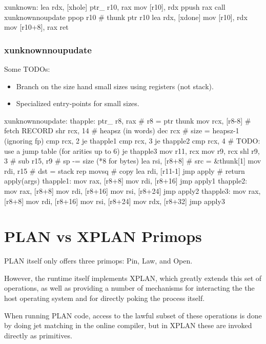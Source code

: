 \begin{asm}
xunknown:
	lea	rdx, [xhole]
	ptr_	r10, rax
	mov	[r10], rdx
	ppush	rax
	call	xunknownnoupdate
	ppop	r10               # thunk
	ptr	r10
	lea	rdx, [xdone]
	mov	[r10], rdx
	mov	[r10+8], rax
	ret
\end{asm}

\subsubsection{xunknownnoupudate}

Some TODOs:

\begin{itemize}
\item Branch on the size hand small sizes using registers (not stack).
\item Specialized entry-points for small sizes.
\end{itemize}

\begin{asm}
xunknownnoupdate:
thapple:
	ptr_	r8, rax        # r8 = ptr thunk
	mov	rcx, [r8-8]    # fetch RECORD
	shr	rcx, 14        # heapsz (in words)
	dec	rcx            # size = heapsz-1 (ignoring fp)
	cmp	rcx, 2
	je	thapple1
	cmp	rcx, 3
	je	thapple2
	cmp	rcx, 4	       # TODO: use a jump table (for arities up to 6)
	je	thapple3
	mov	r11, rcx
	mov	r9, rcx
	shl	r9, 3          #
	sub	r15, r9        # sp -= size (*8 for bytes)
	lea	rsi, [r8+8]    # src = &thunk[1]
	mov	rdi, r15       # dst = stack
	rep	movsq          # copy
	lea	rdi, [r11-1]
	jmp	apply          # return apply(args)
thapple1:
	mov	rax, [r8+8]
	mov	rdi, [r8+16]
	jmp	apply1
thapple2:
	mov	rax, [r8+8]
	mov	rdi, [r8+16]
	mov	rsi, [r8+24]
	jmp	apply2
thapple3:
	mov	rax, [r8+8]
	mov	rdi, [r8+16]
	mov	rsi, [r8+24]
	mov	rdx, [r8+32]
	jmp	apply3
\end{asm}

\section{PLAN vs XPLAN Primops}

PLAN itself only offers three primops: Pin, Law, and Open.

However, the runtime itself implements XPLAN, which greatly extends
this set of operations, as well as providing a number of mechanisms for
interacting the the host operating system and for directly poking the
process itself.

When running PLAN code, access to the lawful subset of these operations
is done by doing jet matching in the online compiler, but in XPLAN these
are invoked directly as primitives.

